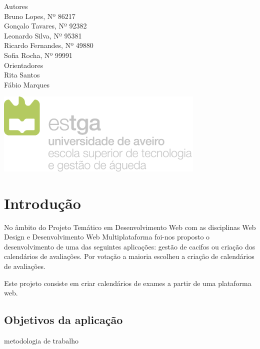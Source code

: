 \documentclass[11pt, twoside]{report}
\begin{document}
\begin{titlepage}
		
		
		\large
		Autores\\
		Bruno Lopes, Nº 86217 \\
		Gonçalo Tavares, Nº 92382  \\
		Leonardo Silva, Nº 95381 \\
		Ricardo Fernandes, Nº 49880  \\
		Sofia Rocha, Nº 99991 \\
		
		\vspace{1cm}
		Orientadores\\
		Rita Santos \\
		Fábio Marques\\
		\vspace{4cm}
		
		\centering
		\includegraphics[width=10cm]{image/AssB_vertical_cor}
		
	\end{titlepage}

	\newpage
	\setcounter{page}{1} %
	\tableofcontents %
	\thispagestyle{plain} %
	\thispagestyle{empty} %
	\newpage
	\listoftables %
	\newpage
	\listoffigures %
	
	\newpage
	
	\chapter{Introdução}
	
	No âmbito do Projeto Temático em Desenvolvimento Web com as disciplinas Web Design e Desenvolvimento Web Multiplataforma foi-nos proposto o desenvolvimento de uma das seguintes aplicações: gestão de cacifos ou criação dos calendários de avaliações. Por votação a maioria escolheu a criação de calendários de avaliações.
	
	Este projeto consiste em criar calendários de exames a partir de uma plataforma web.
	\section{Objetivos da aplicação}
	metodologia de trabalho
	
\end{document}
